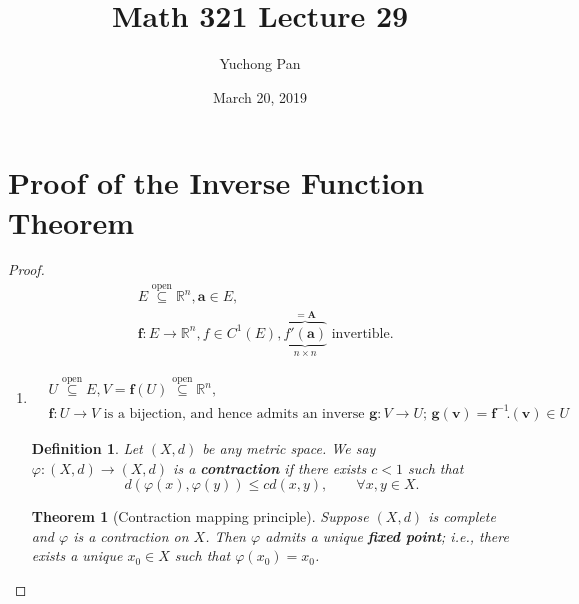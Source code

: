 \documentclass[letterpaper, reqno,11pt]{article}
\newcommand{\RR}{\mathbb{R}}
\begin{document}
\title{Math 321 Lecture 29}
\author{Yuchong Pan}
\date{March 20, 2019}
\newtheorem{thm}{Theorem}
\newtheorem{defn}{Definition}
\newtheorem*{remark}{Remark}
\newtheorem{claim}{Claim}
\newtheorem{cor}{Corollary}
\newtheorem{lemma}{Lemma}
\newtheorem{prop}{Proposition}
\newtheorem{fact}{Fact}
\maketitle
%

\section{Proof of the Inverse Function Theorem}

\begin{proof}
  \renewcommand{\qedsymbol}{}
  \begin{align*}
    & E \overset{\text{open}}{\subseteq} \RR^n, \mathbf a \in E, \\
    & \mathbf f : E \to \RR^n, f \in C^1(E), \text{$\overbrace{\boxed{\underbrace{f'(\mathbf a)}_{n \times n}}}^{= \mathbf A}$ invertible}.
  \end{align*}

  \begin{enumerate}
  \item
    \begin{align*}
      & U \overset{\text{open}}{\subseteq} E, V = \mathbf f(U) \overset{\text{open}}{\subseteq} \RR^n, \\
      & \text{$\mathbf f : U \to V$ is a bijection, and hence admits an inverse $\mathbf g : V \to U$; $\mathbf g(\mathbf v) = \mathbf f^{-1}(\mathbf v) \in U$}.
    \end{align*}


    \begin{defn}
      \normalfont Let $(X, d)$ be any metric space. We say $\varphi : (X, d) \to (X, d)$ is a {\bf contraction} if there exists $c < 1$ such that
      \begin{equation} \label{eq:*} \tag{*}
        d(\varphi(x), \varphi(y)) \leq cd(x, y), \qquad \forall x, y \in X.
      \end{equation}
    \end{defn}

    \begin{thm}[Contraction mapping principle]
      \normalfont Suppose $(X, d)$ is complete and $\varphi$ is a contraction on $X$. Then $\varphi$ admits a unique {\bf fixed point}; i.e., there exists a unique $x_0 \in X$ such that $\varphi(x_0) = x_0$.
    \end{thm}


\end{enumerate}
\end{proof}
\end{document}

